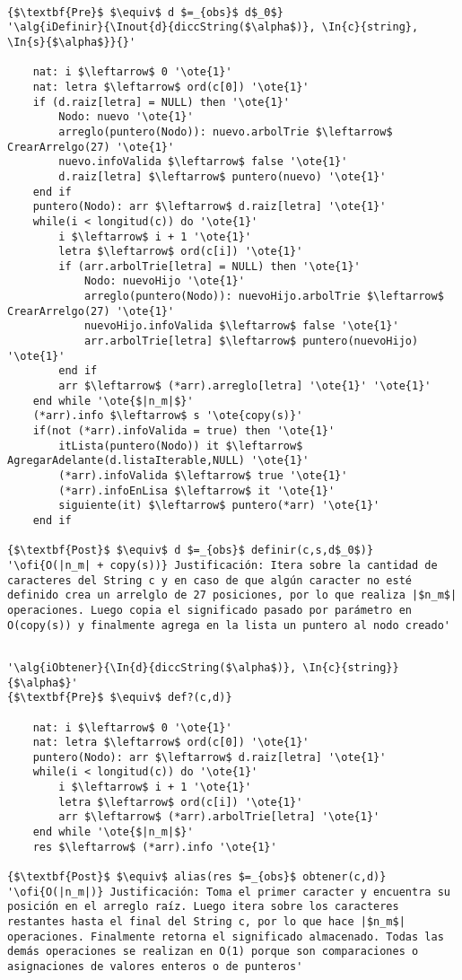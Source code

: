 \begin{lstlisting}[mathescape]

{$\textbf{Pre}$ $\equiv$ d $=_{obs}$ d$_0$}
'\alg{iDefinir}{\Inout{d}{diccString($\alpha$)}, \In{c}{string}, \In{s}{$\alpha$}}{}'

	nat: i $\leftarrow$ 0 '\ote{1}'
	nat: letra $\leftarrow$ ord(c[0]) '\ote{1}'
	if (d.raiz[letra] = NULL) then '\ote{1}'
		Nodo: nuevo '\ote{1}'
		arreglo(puntero(Nodo)): nuevo.arbolTrie $\leftarrow$ CrearArrelgo(27) '\ote{1}'
		nuevo.infoValida $\leftarrow$ false '\ote{1}'
		d.raiz[letra] $\leftarrow$ puntero(nuevo) '\ote{1}'
	end if
	puntero(Nodo): arr $\leftarrow$ d.raiz[letra] '\ote{1}'
	while(i < longitud(c)) do '\ote{1}'
		i $\leftarrow$ i + 1 '\ote{1}'
		letra $\leftarrow$ ord(c[i]) '\ote{1}'
		if (arr.arbolTrie[letra] = NULL) then '\ote{1}'
			Nodo: nuevoHijo '\ote{1}'
			arreglo(puntero(Nodo)): nuevoHijo.arbolTrie $\leftarrow$ CrearArrelgo(27) '\ote{1}'
			nuevoHijo.infoValida $\leftarrow$ false '\ote{1}'
			arr.arbolTrie[letra] $\leftarrow$ puntero(nuevoHijo) '\ote{1}'	
		end if			
		arr $\leftarrow$ (*arr).arreglo[letra] '\ote{1}' '\ote{1}'
	end while '\ote{$|n_m|$}'
    (*arr).info $\leftarrow$ s '\ote{copy(s)}'
    if(not (*arr).infoValida = true) then '\ote{1}'
    	itLista(puntero(Nodo)) it $\leftarrow$ AgregarAdelante(d.listaIterable,NULL) '\ote{1}'
    	(*arr).infoValida $\leftarrow$ true '\ote{1}'
    	(*arr).infoEnLisa $\leftarrow$ it '\ote{1}'
    	siguiente(it) $\leftarrow$ puntero(*arr) '\ote{1}'
    end if

{$\textbf{Post}$ $\equiv$ d $=_{obs}$ definir(c,s,d$_0$)}    	
'\ofi{O(|n_m| + copy(s))} Justificación: Itera sobre la cantidad de caracteres del String c y en caso de que algún caracter no esté definido crea un arrelglo de 27 posiciones, por lo que realiza |$n_m$| operaciones. Luego copia el significado pasado por parámetro en O(copy(s)) y finalmente agrega en la lista un puntero al nodo creado'

\end{lstlisting}

\begin{lstlisting}[mathescape]

'\alg{iObtener}{\In{d}{diccString($\alpha$)}, \In{c}{string}}{$\alpha$}'
{$\textbf{Pre}$ $\equiv$ def?(c,d)}

	nat: i $\leftarrow$ 0 '\ote{1}'
	nat: letra $\leftarrow$ ord(c[0]) '\ote{1}'
	puntero(Nodo): arr $\leftarrow$ d.raiz[letra] '\ote{1}'
	while(i < longitud(c)) do '\ote{1}'
		i $\leftarrow$ i + 1 '\ote{1}'
		letra $\leftarrow$ ord(c[i]) '\ote{1}'
		arr $\leftarrow$ (*arr).arbolTrie[letra] '\ote{1}'
	end while '\ote{$|n_m|$}'
	res $\leftarrow$ (*arr).info '\ote{1}'
	
{$\textbf{Post}$ $\equiv$ alias(res $=_{obs}$ obtener(c,d)}
'\ofi{O(|n_m|)} Justificación: Toma el primer caracter y encuentra su posición en el arreglo raíz. Luego itera sobre los caracteres restantes hasta el final del String c, por lo que hace |$n_m$| operaciones. Finalmente retorna el significado almacenado. Todas las demás operaciones se realizan en O(1) porque son comparaciones o asignaciones de valores enteros o de punteros'

\end{lstlisting}

